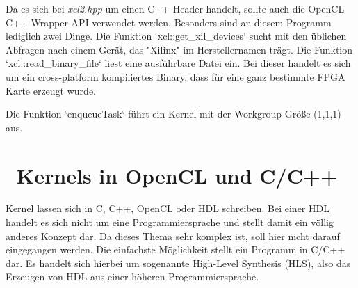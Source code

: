 		Da es sich bei \textit{xcl2.hpp} um einen C++ Header handelt, sollte auch die OpenCL C++ Wrapper \Gls{API} verwendet werden. Besonders sind an diesem Programm lediglich zwei Dinge. Die Funktion \li`xcl::get_xil_devices` sucht mit den üblichen Abfragen nach einem Gerät, das "Xilinx" im Herstellernamen trägt. Die Funktion \li`xcl::read_binary_file` liest eine ausführbare Datei ein. Bei dieser handelt es sich um ein cross-platform kompiliertes Binary, dass für eine ganz bestimmte FPGA Karte erzeugt wurde.
		
		Die Funktion \li`enqueueTask` führt ein \Gls{Kernel} mit der \Gls{Workgroup} Größe (1,1,1) aus.
		
		\section{~Kernels in OpenCL und C/C++}
		\Gls{Kernel} lassen sich in C, C++, OpenCL oder HDL schreiben. Bei einer HDL handelt es sich nicht um eine Programmiersprache und stellt damit ein völlig anderes Konzept dar. Da dieses Thema sehr komplex ist, soll hier nicht darauf eingegangen werden. Die einfachste Möglichkeit stellt ein Programm in C/C++ dar. Es handelt sich hierbei um sogenannte High-Level Synthesis (HLS), also das Erzeugen von HDL aus einer höheren Programmiersprache.
